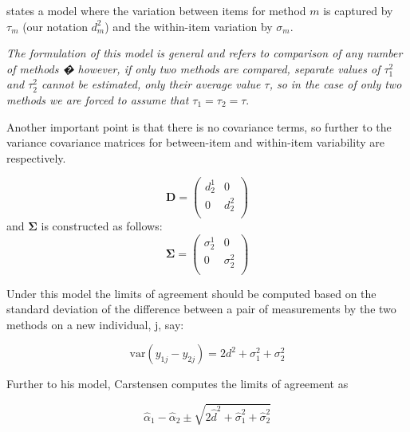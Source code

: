 \documentclass[12pt, a4paper]{report}
\theoremstyle{plain}
\theoremstyle{definition}
\theoremstyle{remark}
\begin{document}
\citet{BXC2008} states a model where the variation between items
for method $m$ is captured by $\tau_m$ (our notation $d^2_m$) and the within-item
variation by $\sigma_m$.

\emph{The formulation of this model is general and refers to comparison
	of any number of methods � however, if only two methods are
	compared, separate values of $\tau^2_1$ and $\tau^2_2$ cannot be
	estimated, only their average value $\tau$, so in the case of only
	two methods we are forced to assume that $\tau_1 = \tau_2 = \tau$}\citep{BXC2008}.

Another important point is that there is no covariance terms, so
further to  \citet{BXC2008} the variance covariance matrices for
between-item and within-item variability are respectively.

\[\boldsymbol{D} = \left(
\begin{array}{cc}
d^1_2  & 0 \\
0 & d^2_2 \\
\end{array}
\right) \]
and  $\boldsymbol{\Sigma}$ is constructed as follows:
\[\boldsymbol{\Sigma} = \left(
\begin{array}{cc}
\sigma^1_2  & 0 \\
0 & \sigma^2_2 \\
\end{array}
\right) \]


Under this model the limits of agreement should be computed based
on the standard deviation of the difference between a pair of
measurements by the two methods on a new individual, j, say:

\[ \mbox{var}(y_{1j} - y_{2j}) = 2d^2 + \sigma^2_1 + \sigma^2_2  \]

Further to his model, Carstensen computes the limits of agreement
as

\[
\hat{\alpha}_1 - \hat{\alpha}_2 \pm \sqrt{2 \hat{d}^2 + 	\hat{\sigma}^2_1 + \hat{\sigma}^2_2}
\]





%
\end{document}
